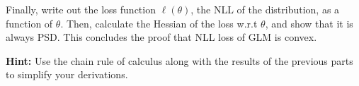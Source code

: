 \clearpage
\item {}
Finally, write out the loss function $\ell(\theta)$, the NLL of the
distribution, as a
function of $\theta$. Then, calculate the Hessian of the loss
w.r.t $\theta$, and show that it is always PSD. This concludes
the proof that NLL loss of GLM is convex.

\textbf{Hint:} Use the chain rule of calculus along with the results of
the previous parts to simplify your derivations.

\ifnum{}\fi
